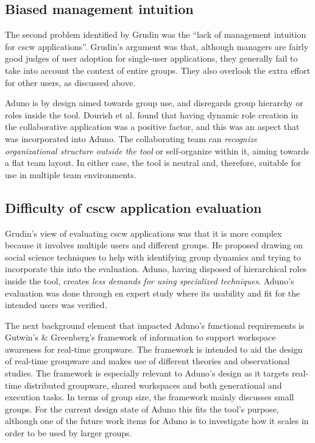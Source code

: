 \documentclass[conference]{IEEEtran}
\begin{document}
\subsection{Biased management intuition}
The second problem identified by Grudin was the ``lack of management intuition for {\sc cscw} applications''. Grudin's argument was that, although managers are fairly good judges of user adoption for single-user applications, they generally fail to take into account the context of entire groups. They also overlook the extra effort for other users, as discussed above.

Aduno is by design aimed towards group use, and disregards group hierarchy or roles inside the tool.  Dourish et al. found that having dynamic role creation in the collaborative application was a positive factor\cite{Dourish:1992:ACS:143457.143468}, and this was an aspect that was incorporated into Aduno.  The collaborating team can \textit{recognize organizational structure outside the tool} or self-organize within it, aiming towards a flat team layout.  In either case, the tool is neutral and, therefore, suitable for use in multiple team environments.

\subsection{Difficulty of {\sc cscw} application evaluation}
Grudin's view of evaluating {\sc cscw} applications was that it is more complex because it involves multiple users and different groups. He proposed drawing on social science techniques to help with identifying group dynamics and trying to incorporate this into the evaluation. Aduno, having disposed of hierarchical roles inside the tool, creates \textit{less demands for using specialized techniques}. Aduno's evaluation was done through en expert study where its usability and fit for the intended users was verified.

The next background element that impacted Aduno's functional requirements is Gutwin's \& Greenberg's \cite{GG02} framework of information to support workspace awareness for real-time groupware. The framework is intended to aid the design of real-time groupware and makes use of different theories and observational studies. The framework is especially relevant to Aduno's design as it targets real-time distributed groupware, shared workspaces and both generational and execution tasks. In terms of group size, the framework mainly discusses small groups. For the current design state of Aduno this fits the tool's purpose, although one of the future work items for Aduno is to investigate how it scales in order to be used by larger groups.
\end{document}
